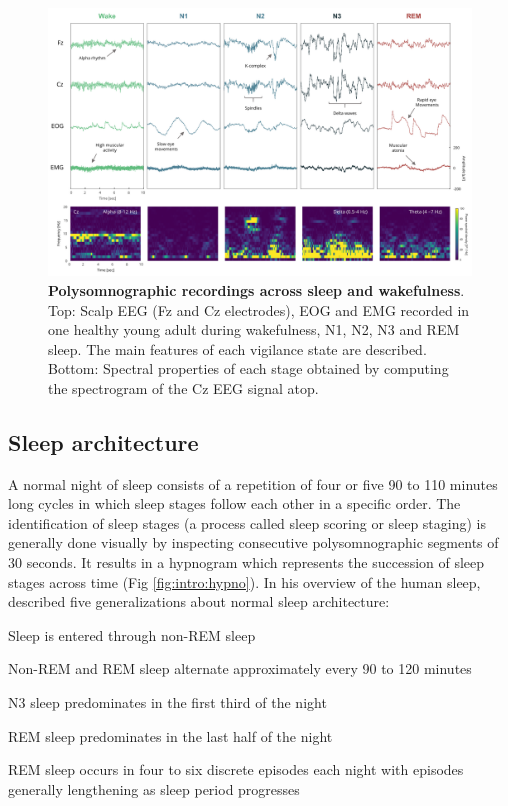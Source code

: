 \begin{figure}
	\centering
	\includegraphics[width=\linewidth, height=0.8\textheight, keepaspectratio]{Fig/Intro/Intro_Sleep_Stages_PSD/Intro_Sleep_Stages_PSD.png}
	\captionsetup{width=0.9\textheight}
	\caption[Polysomnographic recordings across sleep and wakefulness]{\textbf{Polysomnographic recordings across sleep and wakefulness}. Top: Scalp EEG (Fz and Cz electrodes), EOG and EMG recorded in one healthy young adult during wakefulness, N1, N2, N3 and REM sleep. The main features of each vigilance state are described. Bottom: Spectral properties of each stage obtained by computing the spectrogram of the Cz EEG signal atop.}
	\label{fig:intro:sleep_stage}
\end{figure}

\subsection{Sleep architecture}
\label{sec:dream-research:sleep:architecture}

A normal night of sleep consists of a repetition of four or five 90 to 110 minutes long cycles in which sleep stages follow each other in a specific order. The identification of sleep stages (a process called sleep scoring or sleep staging) is generally done visually by inspecting consecutive polysomnographic segments of 30 seconds. It results in a hypnogram which represents the succession of sleep stages across time (Fig \ref{fig:intro:hypno}). In his overview of the human sleep, \citet{hirshkowitz_normal_2004} described five generalizations about normal sleep architecture:

\begin{my_list_num}
    \item Sleep is entered through non-REM sleep
    \item Non-REM and REM sleep alternate approximately every 90 to 120 minutes
	\item N3 sleep predominates in the first third of the night
	\item REM sleep predominates in the last half of the night
	\item REM sleep occurs in four to six discrete episodes each night with episodes generally lengthening as sleep period progresses
\end{my_list_num}


